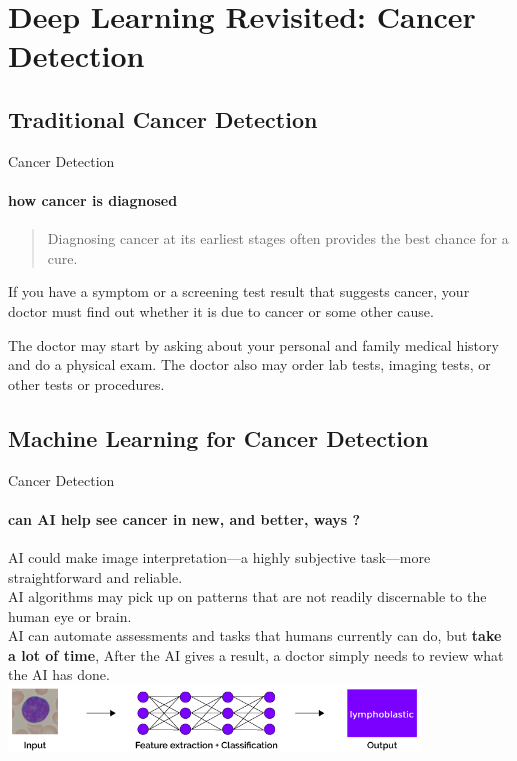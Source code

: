 \documentclass{beamer}
\begin{document}
    \section{Deep Learning Revisited: Cancer Detection}
    \subsection{Traditional Cancer Detection}
    \begin{frame}[t]{Cancer Detection}
      \framesubtitle{how cancer is diagnosed}%
      \begin{quote}
        Diagnosing cancer at its earliest stages often provides the best chance for a cure.
      \end{quote}
      If you have a symptom or a screening test result that suggests cancer, 
      your doctor must find out whether it is due to cancer or some other cause. \\ 
      \vspace{5mm}
      \parbox{0.55\textwidth}{
        The doctor may start by asking about your personal 
        and family medical history and do a physical exam. 
        The doctor also may order lab tests, imaging tests, 
        or other tests or procedures.
      }
    \end{frame}
    \subsection{Machine Learning for Cancer Detection}
    \begin{frame}[t]{Cancer Detection}
      \framesubtitle{can AI help see cancer in new, and better, ways ?}
      AI could make image interpretation—a highly subjective task—more straightforward and reliable. \\
      AI algorithms may pick up on patterns that are not readily discernable to the human eye or brain. \\
      AI can automate assessments and tasks that humans currently can do, but \textbf{take a lot of time},
      After the AI gives a result, a doctor simply needs to review what the AI has done. \\
      \vfill
      \centering
      \includegraphics[height=18mm]{resources/lymphblastic-dl}
    \end{frame}
\end{document}
